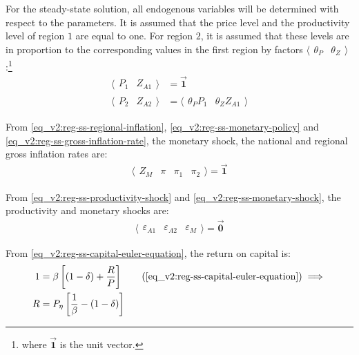 \documentclass[../thesis.tex]{subfiles}
\begin{document}
	For the steady-state solution, all endogenous variables will be determined with respect to the parameters. It is assumed that the price level and the productivity level of region $1$ are equal to one. For region $2$, it is assumed that these levels are in proportion to the corresponding values in the first region by factors $\langle \begin{matrix} \theta_{P} & \theta_{Z} \end{matrix} \rangle$:\footnote{where $\vec{\bm{1}}$ is the unit vector.}
	\begin{align}
		\langle \begin{matrix} P_{1} & Z_{A1} \end{matrix} \rangle &= \vec{\bm{1}} \label{eq_v2:reg-ss-p1-za1} 
		\\ 
		\langle \begin{matrix} P_{2} & Z_{A2} \end{matrix} \rangle &= \langle \begin{matrix} \theta_{P} P_{1} & \theta_{Z} Z_{A1} \end{matrix} \rangle \label{eq_v2:reg-ss-p2-za2}
	\end{align}
	
	From \ref{eq_v2:reg-ss-regional-inflation}, \ref{eq_v2:reg-ss-monetary-policy} and \ref{eq_v2:reg-ss-gross-inflation-rate}, the monetary shock, the national and regional gross inflation rates are:
	\begin{align}
		\langle \begin{matrix} Z_{M} & \pi & \pi_{1} & \pi_{2} \end{matrix} \rangle  = \vec{\bm{1}} \label{eq_v2:reg-ss-zm-pi}
	\end{align}
	
	From \ref{eq_v2:reg-ss-productivity-shock} and \ref{eq_v2:reg-ss-monetary-shock}, the productivity and monetary shocks are:
	\begin{align}
		\langle \begin{matrix} \varepsilon_{A1} & \varepsilon_{A2} & \varepsilon_{M} \end{matrix} \rangle = \vec{\bm{0}} \label{eq_v2:reg-ss-epsilon}
	\end{align}

	
	From \ref{eq_v2:reg-ss-capital-euler-equation}, the return on capital is:
	\begin{align}
		1 &= \beta \left[ (1 - \delta) + \frac{R}{P} \right] \tag{\ref{eq_v2:reg-ss-capital-euler-equation}} \implies \\
		R &= P_{\eta} \left[ \frac{1}{\beta} - (1- \delta) \right] \label{eq_v2:reg-ss-return-on-capital}
	\end{align}
\end{document}
